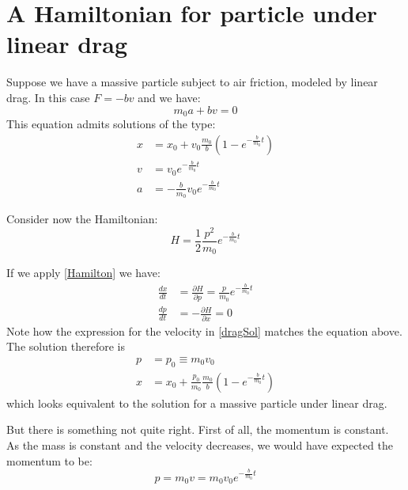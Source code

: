 \documentclass[aps,pra,10pt,floatfix,nofootinbib]{revtex4-1}
\theoremstyle{definition}
\begin{document}
\section{A Hamiltonian for particle under linear drag}

Suppose we have a massive particle subject to air friction, modeled by linear drag. In this case $F=-bv$ and we have:
\begin{equation}
\label{dragEq}
m_0a+bv=0
\end{equation}
This equation admits solutions of the type:
\begin{equation}
\begin{aligned}
x &= x_0+v_0\frac{m_0}{b}(1-e^{-\frac{b}{m_0}t}) \\
v &= v_0 e^{-\frac{b}{m_0}t} \\
a &= -\frac{b}{m_0} v_0 e^{-\frac{b}{m_0}t}
\end{aligned}
\label{dragSol}
\end{equation}

Consider now the Hamiltonian:
\begin{equation}
\label{dragHam}
H = \frac{1}{2} \frac{p^2}{m_0} e^{-\frac{b}{m_0}t}
\end{equation}

If we apply \eqref{Hamilton} we have:
\begin{equation*}
\begin{aligned}
\frac{dx}{dt} &= \frac{\partial H}{\partial p} = \frac{p}{m_0} e^{-\frac{b}{m_0}t} \\ 
\frac{dp}{dt} &= - \frac{\partial H}{\partial x} = 0
\end{aligned}
\end{equation*}
Note how the expression for the velocity in \eqref{dragSol} matches the equation above. The solution therefore is
\begin{equation}
\begin{aligned}
p &= p_0 \equiv m_0 v_0 \\
x &= x_0+\frac{p_0}{m_0}\frac{m_0}{b}(1-e^{-\frac{b}{m_0}t})
\end{aligned}
\label{dragHamSol}
\end{equation}
which looks equivalent to the solution for a massive particle under linear drag.

But there is something not quite right. First of all, the momentum is constant. As the mass is constant and the velocity decreases, we would have expected the momentum to be:
\begin{equation}
\label{dragExpMom}
p = m_0 v = m_0 v_0 e^{-\frac{b}{m_0}t}
\end{equation}
\end{document}

